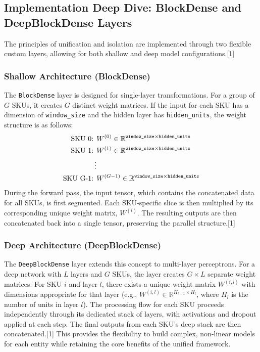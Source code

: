 \documentclass{article}
\begin{document}
\subsection{Implementation Deep Dive: BlockDense and DeepBlockDense Layers}

The principles of unification and isolation are implemented through two flexible custom layers, allowing for both shallow and deep model configurations.[1]

\subsubsection{Shallow Architecture (BlockDense)}

The \texttt{BlockDense} layer is designed for single-layer transformations. For a group of $G$ SKUs, it creates $G$ distinct weight matrices. If the input for each SKU has a dimension of \texttt{window\_size} and the hidden layer has \texttt{hidden\_units}, the weight structure is as follows:
\begin{align*}
\text{SKU 0: } & W^{(0)} \in \mathbb{R}^{\text{\texttt{window\_size}} \times \text{\texttt{hidden\_units}}} \\
\text{SKU 1: } & W^{(1)} \in \mathbb{R}^{\text{\texttt{window\_size}} \times \text{\texttt{hidden\_units}}} \\
\vdots \\
\text{SKU G-1: } & W^{(G-1)} \in \mathbb{R}^{\text{\texttt{window\_size}} \times \text{\texttt{hidden\_units}}}
\end{align*}
During the forward pass, the input tensor, which contains the concatenated data for all SKUs, is first segmented. Each SKU-specific slice is then multiplied by its corresponding unique weight matrix, $W^{(i)}$. The resulting outputs are then concatenated back into a single tensor, preserving the parallel structure.[1]

\subsubsection{Deep Architecture (DeepBlockDense)}

The \texttt{DeepBlockDense} layer extends this concept to multi-layer perceptrons. For a deep network with $L$ layers and $G$ SKUs, the layer creates $G \times L$ separate weight matrices. For SKU $i$ and layer $l$, there exists a unique weight matrix $W^{(i,l)}$ with dimensions appropriate for that layer (e.g., $W^{(i,l)} \in \mathbb{R}^{H_{l-1} \times H_l}$, where $H_l$ is the number of units in layer $l$). The processing flow for each SKU proceeds independently through its dedicated stack of layers, with activations and dropout applied at each step. The final outputs from each SKU's deep stack are then concatenated.[1] This provides the flexibility to build complex, non-linear models for each entity while retaining the core benefits of the unified framework.
\end{document}
